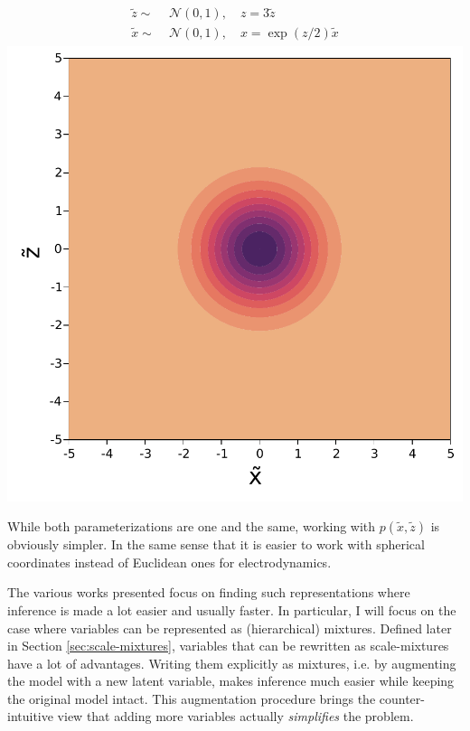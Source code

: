 \begin{minipage}{0.5\textwidth}
    \centering
    \begin{align}
        \begin{aligned}
            \tilde{z} \sim&\; \mathcal{N}(0, 1),\quad z = 3\tilde{z}\\
            \tilde{x} \sim&\; \mathcal{N}(0, 1),\quad x = \exp(z/2)\tilde{x}
        \end{aligned}
    \end{align}
    \includegraphics[width=\textwidth]{./chapters/1_introduction/figures/neals_funnel_non_centered.pdf}
    \label{fig:neals_noncentered}
\end{minipage}
\vspace{0.5cm}

While both parameterizations are one and the same, working with $p(\tilde{x},\tilde{z})$ is obviously simpler.
In the same sense that it is easier to work with spherical coordinates instead of Euclidean ones for electrodynamics. 

The various works presented focus on finding such representations where inference is made a lot easier and usually faster.
In particular, I will focus on the case where variables can be represented as (hierarchical) mixtures.
Defined later in Section \ref{sec:scale-mixtures}, variables that can be rewritten as scale-mixtures have a lot of advantages.
Writing them explicitly as mixtures, i.e. by augmenting the model with a new latent variable, makes inference much easier while keeping the original model intact.
This augmentation procedure brings the counter-intuitive view that adding more variables actually \textit{simplifies} the problem.

